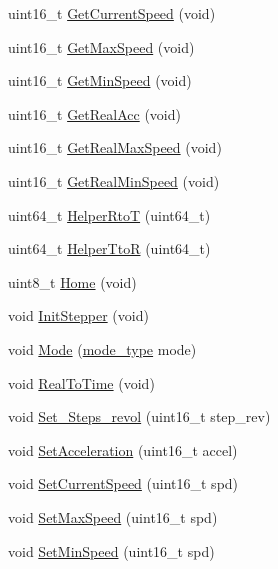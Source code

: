 \begin{DoxyCompactItemize}
\item 
uint16\-\_\-t \hyperlink{group__DRV8825_ga56c30e2b82a23aed1c9febd704166090}{Get\-Current\-Speed} (void)
\item 
uint16\-\_\-t \hyperlink{group__DRV8825_ga356f958c8327643ae22d240493ae7747}{Get\-Max\-Speed} (void)
\item 
uint16\-\_\-t \hyperlink{group__DRV8825_gab0cfe10ce4af9fb931391f171566fef2}{Get\-Min\-Speed} (void)
\item 
uint16\-\_\-t \hyperlink{group__DRV8825_ga819f85ff37467b16c6e6e31ffc858619}{Get\-Real\-Acc} (void)
\item 
uint16\-\_\-t \hyperlink{group__DRV8825_ga20bfcaca6af265d5f8b2dc50f3a26779}{Get\-Real\-Max\-Speed} (void)
\item 
uint16\-\_\-t \hyperlink{group__DRV8825_ga6fdcb3b4ad128890ee607c75a92e63a8}{Get\-Real\-Min\-Speed} (void)
\item 
uint64\-\_\-t \hyperlink{group__DRV8825_ga8f3808b2e4aa3b2a8f6467a2aaa31995}{Helper\-Rto\-T} (uint64\-\_\-t)
\item 
uint64\-\_\-t \hyperlink{group__DRV8825_gabc1e78364b977fdff7ae3b642e720f58}{Helper\-Tto\-R} (uint64\-\_\-t)
\item 
uint8\-\_\-t \hyperlink{group__DRV8825_gaf24afdf808aa610fe7471985b03ea134}{Home} (void)
\item 
void \hyperlink{group__DRV8825_gad7c735bb7a3e49bba5cb72962f045d10}{Init\-Stepper} (void)
\item 
void \hyperlink{group__DRV8825_gafe73070875f7ba05536a1eeb83258c91}{Mode} (\hyperlink{group__DRV8825_ga19269c193c0c4866cdc4e5abd433f9fc}{mode\-\_\-type} mode)
\item 
void \hyperlink{group__DRV8825_gad23127bea36c997c0b1c767f2421db6a}{Real\-To\-Time} (void)
\item 
void \hyperlink{group__DRV8825_ga0c630286eeb4f2b49bfe96670dafd65c}{Set\-\_\-\-Steps\-\_\-revol} (uint16\-\_\-t step\-\_\-rev)
\item 
void \hyperlink{group__DRV8825_ga746cb11e60c877a82b3ecbdbaa375f5e}{Set\-Acceleration} (uint16\-\_\-t accel)
\item 
void \hyperlink{group__DRV8825_ga91f64f1e8f2b67bfcf24f6d2a2249373}{Set\-Current\-Speed} (uint16\-\_\-t spd)
\item 
void \hyperlink{group__DRV8825_gaf56c9e829e6f40a75e89bd16f5051c63}{Set\-Max\-Speed} (uint16\-\_\-t spd)
\item 
void \hyperlink{group__DRV8825_ga39d145b6dc7b1fa19582960613440fd4}{Set\-Min\-Speed} (uint16\-\_\-t spd)

\end{DoxyCompactItemize}
